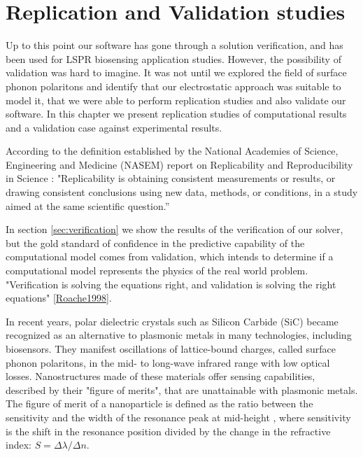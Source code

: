 
\chapter{Replication and Validation studies}

Up to this point our software \pygbe has gone through a solution verification, and has been used for 
LSPR biosensing application studies. However, the possibility of validation was hard to imagine. It was not
until we explored the field of surface phonon polaritons and identify that our electrostatic approach was suitable to model it, 
that we were able to perform replication studies and also validate our software. In this chapter we present replication 
studies of computational results and a validation case against experimental results. 

According to the definition established by the National Academies of Science, Engineering 
and Medicine (NASEM) report on Replicability and Reproducibility in Science \cite{NASEM2019}: "Replicability is obtaining 
consistent measurements or results, or drawing consistent conclusions using new data, methods, or conditions, in a
study aimed at the same scientific question.” 

In section \ref{sec:verification} we show the results of the verification of our 
solver, but the gold standard of confidence in the predictive capability of the computational model comes from validation, which 
intends to determine if a computational model represents the physics of the real world problem. "Verification is solving the equations
right, and validation is solving the right equations" \ref{Roache1998}. 

In recent years, polar dielectric crystals such as Silicon Carbide (SiC) became recognized as an alternative to 
plasmonic metals in many technologies, including biosensors. They manifest oscillations of lattice-bound charges, called surface 
phonon polaritons, in the mid- to long-wave infrared range with low optical losses. Nanostructures made of these materials offer sensing 
capabilities, described by their "figure of merits", that are unattainable with plasmonic metals. The figure of merit of a nanoparticle
is defined as the ratio between the sensitivity and the width of the resonance peak at mid-height \cite{otte2012}, where 
sensitivity is the shift in the resonance position divided by the change in the refractive index: 
$S = \Delta \lambda / \Delta n$. 

